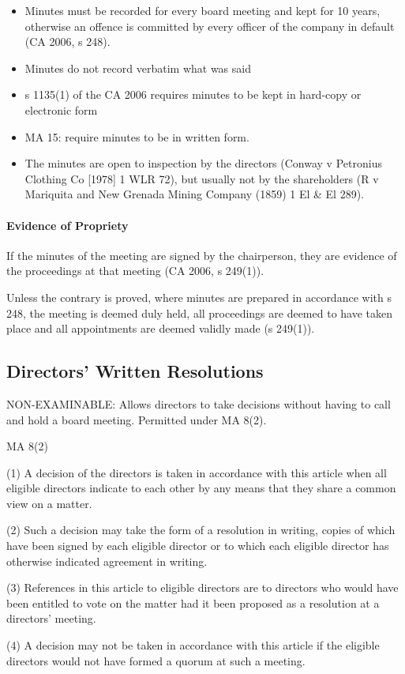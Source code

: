 \documentclass[
]{article}
\providecommand{\tightlist}{%
  \setlength{\itemsep}{0pt}\setlength{\parskip}{0pt}}
\newenvironment{env-12fb5320-b8eb-47b6-8035-097e16242c42}
{
    \savenotes\tcolorbox[blanker,breakable,left=5pt,borderline west={2pt}{-4pt}{green}]
}
{
    \endtcolorbox\spewnotes
}
\begin{document}
\begin{itemize}
\tightlist
\item
  Minutes must be recorded for every board meeting and kept for 10
  years, otherwise an offence is committed by every officer of the
  company in default (CA 2006, s 248).
\item
  Minutes do not record verbatim what was said
\item
  s 1135(1) of the CA 2006 requires minutes to be kept in hard-copy or
  electronic form
\item
  MA 15: require minutes to be in written form.
\item
  The minutes are open to inspection by the directors (Conway v
  Petronius Clothing Co {[}1978{]} 1 WLR 72), but usually not by the
  shareholders (R v Mariquita and New Grenada Mining Company (1859) 1 El
  \& El 289).
\end{itemize}

\hypertarget{evidence-of-propriety}{%
\paragraph{Evidence of Propriety}\label{evidence-of-propriety}}

If the minutes of the meeting are signed by the chairperson, they are
evidence of the proceedings at that meeting (CA 2006, s 249(1)).

Unless the contrary is proved, where minutes are prepared in accordance
with s 248, the meeting is deemed duly held, all proceedings are deemed
to have taken place and all appointments are deemed validly made (s
249(1)).

\hypertarget{directors-written-resolutions}{%
\subsection{Directors' Written
Resolutions}\label{directors-written-resolutions}}

NON-EXAMINABLE: Allows directors to take decisions without having to
call and hold a board meeting. Permitted under MA 8(2).

\begin{env-12fb5320-b8eb-47b6-8035-097e16242c42}

MA 8(2)

(1) A decision of the directors is taken in accordance with this article
when all eligible directors indicate to each other by any means that
they share a common view on a matter.

(2) Such a decision may take the form of a resolution in writing, copies
of which have been signed by each eligible director or to which each
eligible director has otherwise indicated agreement in writing.

(3) References in this article to eligible directors are to directors
who would have been entitled to vote on the matter had it been proposed
as a resolution at a directors' meeting.

(4) A decision may not be taken in accordance with this article if the
eligible directors would not have formed a quorum at such a meeting.

\end{env-12fb5320-b8eb-47b6-8035-097e16242c42}
\end{document}
